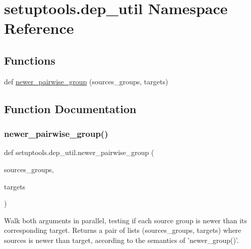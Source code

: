 \hypertarget{namespacesetuptools_1_1dep__util}{}\section{setuptools.\+dep\+\_\+util Namespace Reference}
\label{namespacesetuptools_1_1dep__util}
\subsection*{Functions}
\begin{DoxyCompactItemize}
\item 
def \hyperlink{namespacesetuptools_1_1dep__util_a83772c8bd4802b5767314b56253543c2}{newer\+\_\+pairwise\+\_\+group} (sources\+\_\+groups, targets)
\end{DoxyCompactItemize}


\subsection{Function Documentation}
\mbox{\label{namespacesetuptools_1_1dep__util_a83772c8bd4802b5767314b56253543c2}} 
\subsubsection{\texorpdfstring{newer\+\_\+pairwise\+\_\+group()}{newer\_pairwise\_group()}}
{\footnotesize\ttfamily def setuptools.\+dep\+\_\+util.\+newer\+\_\+pairwise\+\_\+group (\begin{DoxyParamCaption}\item[{}]{sources\+\_\+groups,  }\item[{}]{targets }\end{DoxyParamCaption})}

\begin{DoxyVerb}Walk both arguments in parallel, testing if each source group is newer
than its corresponding target. Returns a pair of lists (sources_groups,
targets) where sources is newer than target, according to the semantics
of 'newer_group()'.
\end{DoxyVerb}
 